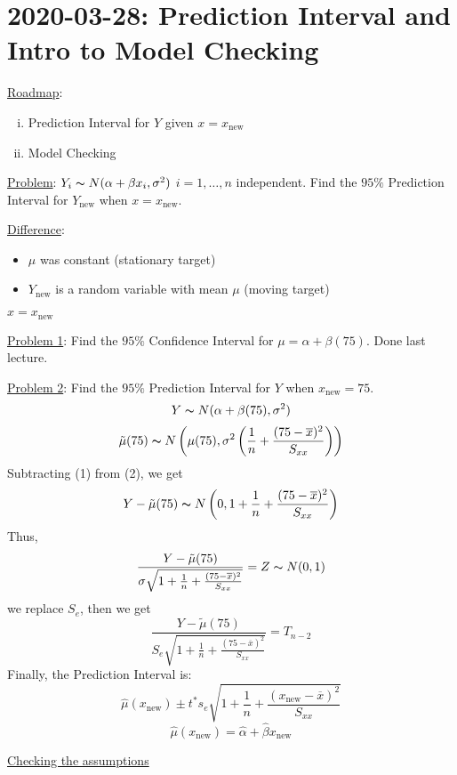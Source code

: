 \section{2020-03-28: Prediction Interval and Intro to Model Checking}
\underline{Roadmap}:
\begin{enumerate}[(i)]
    \item Prediction Interval for $ Y $ given $ x=x_{\text{new}} $
    \item Model Checking
\end{enumerate}
\underline{Problem}: $ Y_i \thicksim N(\alpha+\beta x_i,\sigma^2) $
$ i=1,\ldots ,n $ independent. Find the $ 95\% $ Prediction Interval
for $ Y_{\text{new}} $ when $ x=x_{\text{new}} $.

\underline{Difference}:
\begin{itemize}
    \item $ \mu $ was constant (stationary target)
    \item $ Y_{\text{new}} $ is a random variable with mean $ \mu $
          (moving target)
\end{itemize}

\begin{exbox}
    \begin{example}
        $ x=x_{\text{new}} $

        \underline{Problem 1}: Find the $ 95\% $ Confidence Interval for
        $ \mu=\alpha+\beta(75) $. Done last lecture.

        \underline{Problem 2}: Find the $ 95\% $ Prediction Interval for
        $ Y $ when $ x_{\text{new}}=75 $.
        \begin{equation}
            Y \thicksim N(\alpha+\beta(75),\sigma^2)
        \end{equation}
        \begin{equation}
            \tilde{\mu}(75) \thicksim N
            \left(\mu(75),\sigma^2\left( \frac{1}{n} +
                \frac{(75-\overline{x})^2}{S_{xx}} \right)\right)
        \end{equation}
        Subtracting (1) from (2), we get
        \[ Y-\tilde{\mu}(75) \thicksim N\left( 0,
            1+\frac{1}{n} + \frac{(75-\overline{x})^2}{S_{xx}} \right) \]
        Thus,
        \[ \frac{Y-\tilde{\mu}(75)}
            {\sigma\sqrt{1+\frac{1}{n} + \frac{(75-\overline{x})^2}{S_{xx}}}}=
            Z \thicksim N(0,1)  \]
        we replace $ S_e $, then we get
        \[ \frac{Y-\tilde{\mu}(75)}
            {S_e\sqrt{1+\frac{1}{n} + \frac{(75-\overline{x})^2}{S_{xx}}}}=
            T_{n-2} \]
        Finally, the Prediction Interval is:
        \[ \hat{\mu}(x_{\text{new}})\pm
            t^* s_e
            \sqrt{1+\frac{1}{n} + \frac{(x_{\text{new}}-\overline{x})^2}{S_{xx}}} \]
        \[ \hat{\mu}(x_{\text{new}})=\hat{\alpha}+\hat{\beta}x_{\text{new}} \]
    \end{example}
\end{exbox}
\underline{Checking the assumptions}

